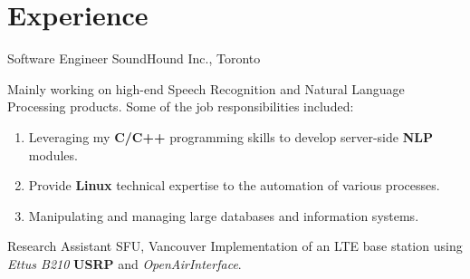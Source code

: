 \documentclass[letterpaper]{twentysecondcv} %
\begin{document}

\section{Experience}

\begin{twenty}

             {Software Engineer}
             {SoundHound Inc., Toronto}
             {Mainly working on high-end Speech Recognition and Natural Language Processing products. Some of the job responsibilities included:
             \begin{enumerate}
                 \item{Leveraging my \textbf{C/C++} programming skills to develop server-side \textbf{NLP} modules.}
                 \item{Provide \textbf{Linux} technical expertise to the automation of various processes.}
                 \item{Manipulating and managing large databases and information systems.}
             \end{enumerate}
             }

               {Research Assistant}
               {SFU, Vancouver}
               {Implementation of an LTE base station using \textit{Ettus B210} \textbf{USRP} and \textit{OpenAirInterface}.
               }


\end{twenty}
\end{document}

